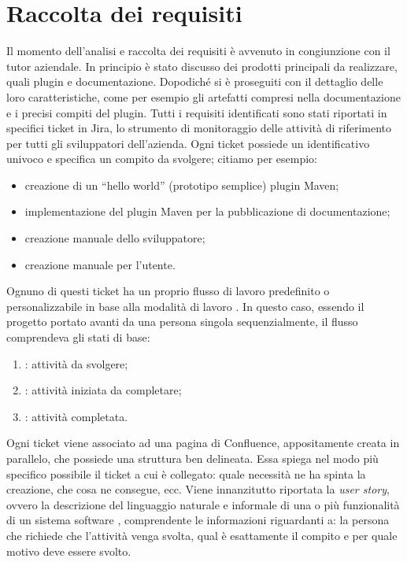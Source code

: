 \section{Raccolta dei requisiti}
Il momento dell'analisi e raccolta dei requisiti è avvenuto in congiunzione con il tutor aziendale.
In principio è stato discusso dei prodotti principali da realizzare, quali plugin e documentazione. 
Dopodiché si è proseguiti con il dettaglio delle loro caratteristiche, come per esempio gli artefatti compresi nella documentazione e i precisi compiti del plugin.
Tutti i requisiti identificati sono stati riportati in specifici ticket in Jira, lo strumento di monitoraggio delle attività di riferimento per tutti gli sviluppatori dell'azienda.
Ogni ticket possiede un identificativo univoco e specifica un compito da svolgere; citiamo per esempio:
\begin{itemize}
	\item creazione di un ``hello world'' (prototipo semplice) plugin Maven;
	\item implementazione del plugin Maven per la pubblicazione di documentazione;
	\item creazione manuale dello sviluppatore;
	\item creazione manuale per l'utente.
\end{itemize}
Ognuno di questi ticket ha un proprio flusso di lavoro predefinito o personalizzabile in base alla modalità di lavoro \cite{site:jira}.
In questo caso, essendo il progetto portato avanti da una persona singola sequenzialmente, il flusso comprendeva gli stati di base:
\begin{enumerate}
	\item {}: attività da svolgere;
	\item {}: attività iniziata da completare;
	\item {}: attività completata.
\end{enumerate} 
Ogni ticket viene associato ad una pagina di Confluence, appositamente creata in parallelo, che possiede una struttura ben delineata.
Essa spiega nel modo più specifico possibile il ticket a cui è collegato: quale necessità ne ha spinta la creazione, che cosa ne consegue, ecc.
Viene innanzitutto riportata la \emph{user story}, ovvero la descrizione del linguaggio naturale e informale di una o più funzionalità di un sistema software \cite{site:user-story}, comprendente le informazioni riguardanti a: la persona che richiede che l'attività venga svolta, qual è esattamente il compito e per quale motivo deve essere svolto.
